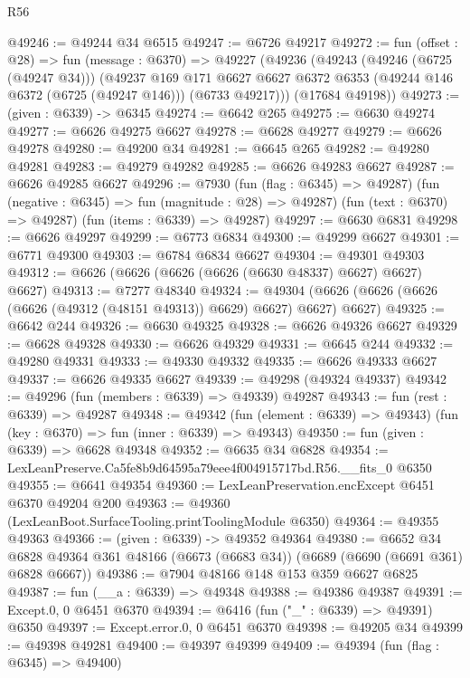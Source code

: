 \begin{lexlean}{R56}
\begin{coremodule}
@49246 := @49244 @34 @6515
@49247 := @6726 @49217
@49272 := fun (offset : @28) =>
  fun (message : @6370) =>
  @49227
    (@49236
      (@49243
        (@49246 (@6725 (@49247 @34)))
        (@49237
          @169
          @171
          @6627
          @6627
          @6372
          @6353
          (@49244 @146 @6372 (@6725 (@49247 @146)))
          (@6733 @49217)))
      (@17684 @49198))
@49273 := (given : @6339) -> @6345
@49274 := @6642 @265
@49275 := @6630 @49274
@49277 := @6626 @49275 @6627
@49278 := @6628 @49277
@49279 := @6626 @49278
@49280 := @49200 @34
@49281 := @6645 @265
@49282 := @49280 @49281
@49283 := @49279 @49282
@49285 := @6626 @49283 @6627
@49287 := @6626 @49285 @6627
@49296 := @7930
    (fun (flag : @6345) => @49287)
    (fun (negative : @6345) => fun (magnitude : @28) => @49287)
    (fun (text : @6370) => @49287)
    (fun (items : @6339) => @49287)
@49297 := @6630 @6831
@49298 := @6626 @49297
@49299 := @6773 @6834
@49300 := @49299 @6627
@49301 := @6771 @49300
@49303 := @6784 @6834 @6627
@49304 := @49301 @49303
@49312 := @6626 (@6626 (@6626 (@6626 (@6630 @48337) @6627) @6627) @6627)
@49313 := @7277 @48340
@49324 := @49304 (@6626 (@6626 (@6626 (@6626 (@49312 (@48151 @49313)) @6629) @6627) @6627) @6627)
@49325 := @6642 @244
@49326 := @6630 @49325
@49328 := @6626 @49326 @6627
@49329 := @6628 @49328
@49330 := @6626 @49329
@49331 := @6645 @244
@49332 := @49280 @49331
@49333 := @49330 @49332
@49335 := @6626 @49333 @6627
@49337 := @6626 @49335 @6627
@49339 := @49298 (@49324 @49337)
@49342 := @49296 (fun (members : @6339) => @49339) @49287
@49343 := fun (rest : @6339) => @49287
@49348 := @49342
    (fun (element : @6339) => @49343)
    (fun (key : @6370) => fun (inner : @6339) => @49343)
@49350 := fun (given : @6339) => @6628 @49348
@49352 := @6635 @34 @6828
@49354 := LexLeanPreserve.Ca5fe8b9d64595a79eee4f004915717bd.R56.__fits_0 @6350
@49355 := @6641 @49354
@49360 := LexLeanPreservation.encExcept @6451 @6370 @49204 @200
@49363 := @49360 (LexLeanBoot.SurfaceTooling.printToolingModule @6350)
@49364 := @49355 @49363
@49366 := (given : @6339) -> @49352 @49364
@49380 := @6652
    @34
    @6828
    @49364
    @361
    @48166
    (@6673 (@6683 @34))
    (@6689 (@6690 (@6691 @361) @6828 @6667))
@49386 := @7904 @48166 @148 @153 @359 @6627 @6825
@49387 := fun (__a : @6339) => @49348
@49388 := @49386 @49387
@49391 := Except.{0, 0} @6451 @6370
@49394 := @6416 (fun ("_" : @6339) => @49391) @6350
@49397 := Except.error.{0, 0} @6451 @6370
@49398 := @49205 @34
@49399 := @49398 @49281
@49400 := @49397 @49399
@49409 := @49394
    (fun (flag : @6345) => @49400)

\end{coremodule}
\end{lexlean}
